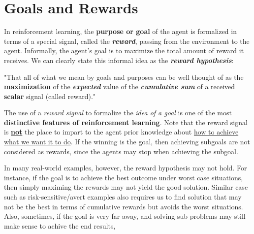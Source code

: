 \documentclass[11pt]{article}
\begin{document}
\section{Goals and Rewards}
In reinforcement learning, the \textbf{purpose or goal} of the agent is formalized in terms of a special signal, called the \emph{\textbf{reward}}, passing from the environment to the agent. Informally, the agent’s goal is to maximize the total amount of reward it receives. We can clearly state this informal idea as the \emph{\textbf{reward hypothesis}}:

 "That all of what we mean by goals and purposes can be well thought of as
the \textbf{maximization} of the \emph{\textbf{expected}} value of the \emph{\textbf{cumulative sum}} of a received \textbf{scalar} signal (called reward)."

The use of a \emph{reward signal} to formalize the \emph{idea of a goal} is one of the most \textbf{distinctive features of reinforcement learning}. Note that the reward signal is \underline{\textbf{not}} the place to impart to the agent prior knowledge about \underline{how to achieve what we want it to do}. If the winning is the goal, then achieving subgoals are not considered as rewards, since the agents may stop when achieving the subgoal. 

In many real-world examples, however, the reward hypothesis may not hold. For instance, if the goal is to achieve the best outcome under worst case situations, then simply maximing the rewards may not yield the good solution. Similar case such as risk-sensitive/avert examples also requires us to find solution that may not be the best in terms of cumulative rewards but avoids the worst situations.  Also, sometimes, if the goal is very far away, and solving sub-problems may still make sense to achive the end results, 
\end{document}
